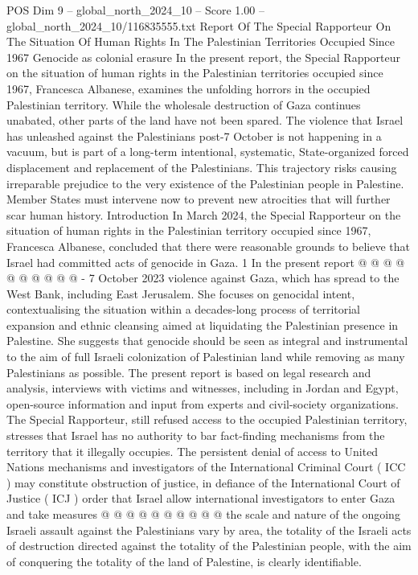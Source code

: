 \begin{textsample}{POS Dim 9 – global\_north\_2024\_10 – Score 1.00 – global\_north\_2024\_10/116835555.txt}  \label{ex:f9_pos_397}
Report Of The Special Rapporteur On The Situation Of Human Rights In The Palestinian Territories Occupied Since 1967 Genocide as colonial erasure In the present report, the Special Rapporteur on the situation of human rights in the Palestinian territories occupied since 1967, Francesca Albanese, examines the unfolding horrors in the occupied Palestinian territory.
While the wholesale destruction of Gaza continues unabated, other parts of the land have not been spared.
The violence that Israel has unleashed against the Palestinians post-7 October is not happening in a vacuum, but is part of a long-term intentional, systematic, State-organized forced displacement and replacement of the Palestinians.
This trajectory risks causing irreparable prejudice to the very existence of the Palestinian people in Palestine.
Member States must intervene now to prevent new atrocities that will further scar human history.
Introduction In March 2024, the Special Rapporteur on the situation of human rights in the Palestinian territory occupied since 1967, Francesca Albanese, concluded that there were reasonable grounds to believe that Israel had committed acts of genocide in Gaza. 1 In the present report @ @ @ @ @ @ @ @ @ @ - 7 October 2023 violence against Gaza, which has spread to the West Bank, including East Jerusalem.
She focuses on genocidal intent, contextualising the situation within a decades-long process of territorial expansion and ethnic cleansing aimed at liquidating the Palestinian presence in Palestine.
She suggests that genocide should be seen as integral and instrumental to the aim of full Israeli colonization of Palestinian land while removing as many Palestinians as possible.
The present report is based on legal research and analysis, interviews with victims and witnesses, including in Jordan and Egypt, open-source information and input from experts and civil-society organizations.
The Special Rapporteur, still refused access to the occupied Palestinian territory, stresses that Israel has no authority to bar fact-finding mechanisms from the territory that it illegally occupies.
The persistent denial of access to United Nations mechanisms and investigators of the International Criminal Court ( ICC ) may constitute obstruction of justice, in defiance of the International Court of Justice ( ICJ ) order that Israel allow international investigators to enter Gaza and take measures @ @ @ @ @ @ @ @ @ @ the scale and nature of the ongoing Israeli assault against the Palestinians vary by area, the totality of the Israeli acts of destruction directed against the totality of the Palestinian people, with the aim of conquering the totality of the land of Palestine, is clearly identifiable.

\end{textsample}
